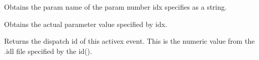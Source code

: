 \label{wxactivexeventparamname}


Obtains the param name of the param number idx specifies as a string.


\label{wxactivexeventoparray}


Obtains the actual parameter value specified by idx.


\label{wxactivexeventgetdispatchid}


Returns the dispatch id of this activex event. This is the numeric value from
the .idl file specified by the id().
